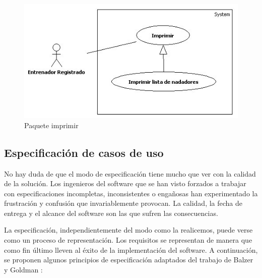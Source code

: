 		\begin{figure}[H]
		  \centering
		    \includegraphics[width=11.5cm]{./eps/casos_uso/imprimir.eps}
		  \caption{Paquete imprimir}
		  \label{fig:analisis_imprimir}
		\end{figure}
		
	
	\newpage
	
	\subsection{Especificación de casos de uso} %
		\label{sub:especificacion_de_casos_de_uso}
		
		No hay duda de que el modo de especificación tiene mucho que ver con la calidad de la solución. Los ingenieros del software que se han visto forzados a trabajar con especificaciones incompletas, inconsistentes o engañosas han experimentado la frustración y confusión que invariablemente provocan. La calidad, la fecha de entrega y el alcance del software son las que sufren las consecuencias.
		
		La especificación, independientemente del modo como la realicemos, puede verse como un proceso de representación. Los requisitos se representan de manera que como fin último lleven al éxito de la implementación del software. A continuación, se proponen algunos principios de especificación adaptados del trabajo de Balzer y Goldman \cite{BAL86}:
		
